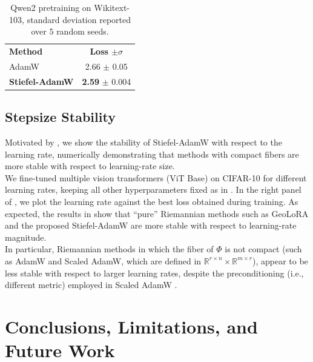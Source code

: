 \documentclass[11pt,a4paper]{article}
\numberwithin{equation}{section}
\newcommand{\algname}{Stiefel-AdamW}
\newcommand{\R}{\mathbb{R}}
\theoremstyle{plain}
\theoremstyle{definition}
\theoremstyle{remark}
\begin{document}
\begin{table}[!ht]
    \centering
    \caption{Qwen2 pretraining on Wikitext-103, standard deviation reported over $5$ random seeds.}
    \begin{tabular}{l c}
            \toprule
            \multirow{2}{*}{\textbf{Method}}& \multirow{2}{*}{\textbf{Loss $\pm \sigma$}} \\ \\
            \midrule
            AdamW            & 2.66 $\pm$ 0.05 \\
            \textbf{\algname} & \textbf{2.59} $\pm$ 0.004  \\
            \bottomrule
        \end{tabular} 
    \label{tab:qwen}
\end{table}

\vspace{-1em}

\subsection{Stepsize Stability}
Motivated by , we show the stability of \algname{} with respect to the learning rate, numerically demonstrating that methods with compact fibers are more stable with respect to learning-rate size. \\
We fine-tuned multiple vision transformers (ViT Base) on CIFAR-10 for different learning rates, keeping all other hyperparameters fixed as in . In the right panel of , we plot the learning rate against the best loss obtained during training. As expected, the results in  show that ``pure'' Riemannian methods such as GeoLoRA \cite{schotthofer2025geolora} and the proposed \algname{} are more stable with respect to learning-rate magnitude. \\
In particular, Riemannian methods in which the fiber of $\Phi$ is not compact (such as AdamW and Scaled AdamW, which are defined in $\R^{r \times n} \times \R^{m \times r}$), appear to be less stable with respect to larger learning rates, despite the preconditioning (i.e., different metric) employed in Scaled AdamW \cite{ZhangPilanci2024}.


\section{Conclusions, Limitations, and Future Work}
\end{document}
